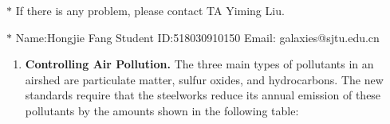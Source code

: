 \documentclass[12pt,a4paper]{article}
\theoremstyle{definition}
\begin{document}
\noindent

\noindent{}
\begin{center}
\footnotesize{\color{red}$*$ If there is any problem, please contact TA Yiming Liu. }

\footnotesize{\color{blue}$*$ Name:Hongjie Fang  \quad Student ID:518030910150 \quad Email: galaxies@sjtu.edu.cn}
\end{center}
\begin{enumerate}

   \item
   \textbf{Controlling Air Pollution. }The three main types of pollutants in an airshed are particulate matter, sulfur oxides, and hydrocarbons. The new standards require that the steelworks reduce its annual emission of these pollutants by the amounts shown in the following table:
	\begin{table}[h]
		\footnotesize
		\centering
	    \label{standards}
	    \renewcommand\arraystretch{1.1}
		\begin{tabular}{lc}
			

\end{tabular}
\end{table}
\end{enumerate}
\end{document}
